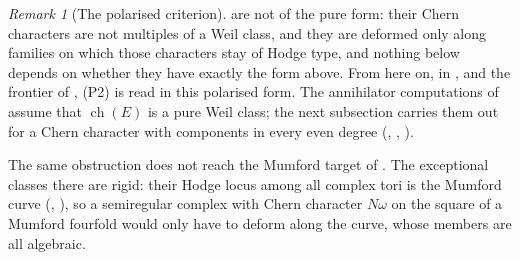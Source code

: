 \documentclass[11pt,reqno]{amsart}
\theoremstyle{plain}
\theoremstyle{definition}
\theoremstyle{remark}
\newtheorem{remark}[theorem]{Remark}
\DeclareMathOperator{\ch}{ch}
\begin{document}
\begin{remark}[The polarised criterion]
\cite{Mar25a,Mar25b} are not of the pure form: their Chern characters are not
multiples of a Weil class, and they are deformed only along families on which
those characters stay of Hodge type, and nothing below depends on whether
they have exactly the form above. From here on, in
\cite[Corollary~2.71]{paperIII}, \cite[Theorem~2.70]{paperIII} and the frontier of
\cite[Section~2]{paperIII}, \textup{(P2)} is read in this polarised form. The
annihilator computations of \cite[Section~16]{paperI} assume that $\ch(E)$ is a
pure Weil class; the next subsection carries them out for a Chern character
with components in every even degree (,
, ).

The same obstruction does not reach the Mumford target of
\cite[Section~3.2]{paperIII}. The exceptional classes there are rigid: their Hodge
locus among all complex tori is the Mumford curve (\cite[Theorem~3.21]{paperIII},
\cite[Proposition~3.24]{paperIII}), so a semiregular complex with Chern character
$N\omega$ on the square of a Mumford fourfold would only have to deform along
the curve, whose members are all algebraic.
\end{remark}
\end{document}
